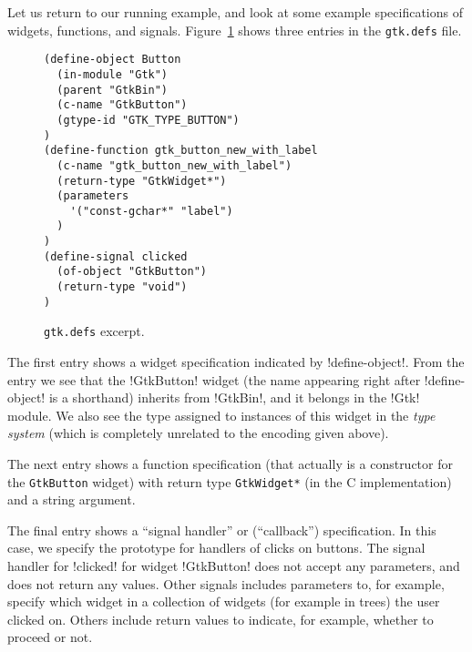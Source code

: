 \documentclass[workingdraft]{usetex-v1}
\begin{document}
Let us return to our running example, and look at some example
specifications of widgets, functions, and signals. Figure~\ref{fig:gtk-defs}
shows three entries in the \texttt{gtk.defs} file.
\begin{figure}[htbp]
\begin{centering}
\begin{verbatim}
(define-object Button
  (in-module "Gtk")
  (parent "GtkBin")
  (c-name "GtkButton")
  (gtype-id "GTK_TYPE_BUTTON")
)
(define-function gtk_button_new_with_label
  (c-name "gtk_button_new_with_label")
  (return-type "GtkWidget*")
  (parameters
    '("const-gchar*" "label")
  )
)
(define-signal clicked
  (of-object "GtkButton")
  (return-type "void")
)
\end{verbatim}
\caption{\texttt{gtk.defs} excerpt.\label{fig:gtk-defs}}
\end{centering}
\end{figure}
The first entry shows a widget specification indicated by
!define-object!. From the entry we see that the !GtkButton! widget
(the name appearing right after !define-object! is a shorthand)
inherits from !GtkBin!, and it belongs in the !Gtk! module.  We also
see the type assigned to instances of this widget in the \emph{\gtk type
system} (which is completely unrelated to the \sml encoding given
above).

The next entry shows a function specification (that actually is a
constructor for the \texttt{GtkButton} widget) with return type
\texttt{GtkWidget*} (in the C implementation) and a string argument.

The final entry shows a ``signal handler'' or (``callback'')
specification. In this case, we specify the prototype for handlers
of clicks on buttons. The signal handler for !clicked! for widget
!GtkButton! does not accept any parameters, and does not return any
values. Other signals includes parameters to, for example, specify
which widget in a collection of widgets (for example in trees) the
user clicked on. Others include return values to indicate, for example,
whether to proceed or not.



\end{document}
